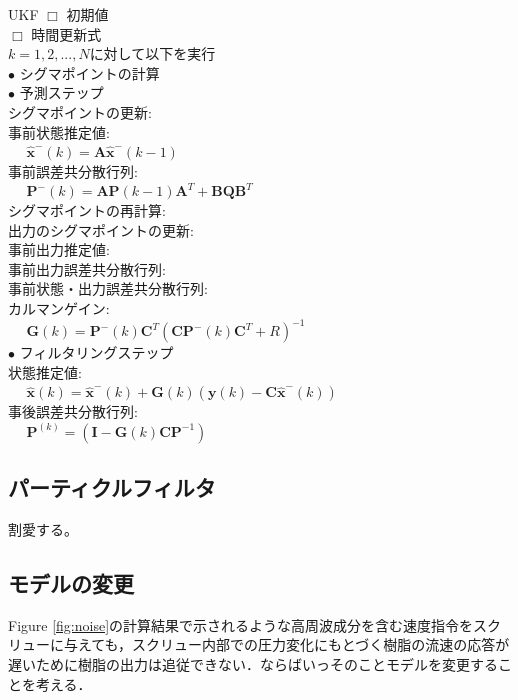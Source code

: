\documentclass[twocolumn,oneside,a4paper]{article}
\begin{document}
  \begin{itembox}[l]{UKF}
    $\Box$ 初期値\\

    $\Box$ 時間更新式\\
    $k=1,2,...,N$に対して以下を実行\\
     $\bullet$ シグマポイントの計算\\

     $\bullet$ 予測ステップ\\
     シグマポイントの更新: \\

     事前状態推定値: \\
     $\:\:\:\:\:\: \hat{\bm{x}}^{-}(k) = \bm{A}\hat{\bm{x}}^{-}(k-1)$\\
     事前誤差共分散行列: \\
     $\:\:\:\:\:\: \bm{P}^{-}(k)=\bm{A}\bm{P}(k-1)\bm{A}^{T}+\bm{BQ}\bm{B}^T$\\         
     シグマポイントの再計算: \\
     出力のシグマポイントの更新: \\
     事前出力推定値: \\
     事前出力誤差共分散行列: \\
     事前状態・出力誤差共分散行列: \\
     カルマンゲイン: \\
     $\:\:\:\:\:\: \bm{G}(k)=\bm{P}^{-}(k)\bm{C}^T(\bm{C}\bm{P}^{-}(k)\bm{C}^{T}+R)^{-1}$\\

     $\bullet$ フィルタリングステップ\\
     状態推定値: \\
     $\:\:\:\:\:\: \hat{\bm{x}}(k) = \hat{\bm{x}}^{-}(k) + \bm{G}(k)(\bm{y}(k)-\bm{C}\hat{\bm{x}}^{-}(k))$\\
     事後誤差共分散行列: \\
     $\:\:\:\:\:\: \bm{P}^(k)=(\bm{I}-\bm{G}(k)\bm{C}\bm{P}^{-1})$
  \end{itembox}


\subsection{パーティクルフィルタ}
割愛する。


\subsection{モデルの変更}
Figure \ref{fig:noise}の計算結果で示されるような高周波成分を含む速度指令をスクリューに与えても，スクリュー内部での圧力変化にもとづく樹脂の流速の応答が遅いために樹脂の出力は追従できない．ならばいっそのことモデルを変更することを考える．
\end{document}
